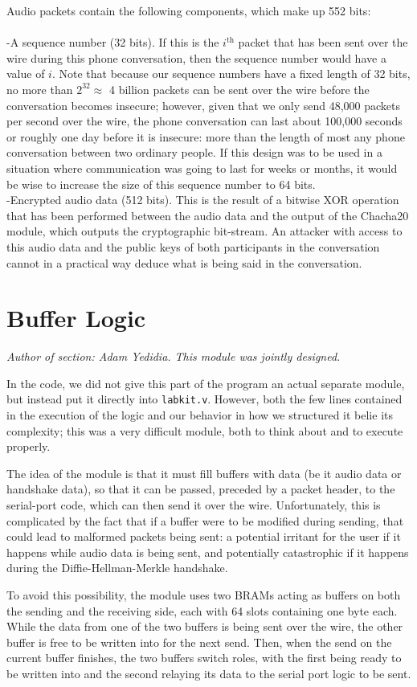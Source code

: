 \documentclass[a4paper]{report}
\begin{document}
Audio packets contain the following components, which make up 552 bits: \\ \\
-A sequence number (32 bits). If this is the $i^{\textrm{th}}$ packet that has been sent over the wire during this phone conversation, then the sequence number would have a value of $i$. Note that because our sequence numbers have a fixed length of 32 bits, no more than $2^{32} \approx $ 4 billion packets can be sent over the wire before the conversation becomes insecure; however, given that we only send 48,000 packets per second over the wire, the phone conversation can last about 100,000 seconds or roughly one day before it is insecure: more than the length of most any phone conversation between two ordinary people. If this design was to be used in a situation where communication was going to last for weeks or months, it would be wise to increase the size of this sequence number to 64 bits. \\
-Encrypted audio data (512 bits). This is the result of a bitwise XOR operation that has been performed between the audio data and the output of the Chacha20 module, which outputs the cryptographic bit-stream. An attacker with access to this audio data and the public keys of both participants in the conversation cannot in a practical way deduce what is being said in the conversation. \\

\section{Buffer Logic}

\emph{Author of section: Adam Yedidia. This module was jointly designed.}

In the code, we did not give this part of the program an actual separate module, but instead put it directly into \verb|labkit.v|. However, both the few lines contained in the execution of the logic and our behavior in how we structured it belie its complexity; this was a very difficult module, both to think about and to execute properly.

The idea of the module is that it must fill buffers with data (be it audio data or handshake data), so that it can be passed, preceded by a packet header, to the serial-port code, which can then send it over the wire. Unfortunately, this is complicated by the fact that if a buffer were to be modified during sending, that could lead to malformed packets being sent: a potential irritant for the user if it happens while audio data is being sent, and potentially catastrophic if it happens during the Diffie-Hellman-Merkle handshake.

To avoid this possibility, the module uses two BRAMs acting as buffers on both the sending and the receiving side, each with 64 slots containing one byte each. While the data from one of the two buffers is being sent over the wire, the other buffer is free to be written into for the next send. Then, when the send on the current buffer finishes, the two buffers switch roles, with the first being ready to be written into and the second relaying its data to the serial port logic to be sent.




\end{document}
